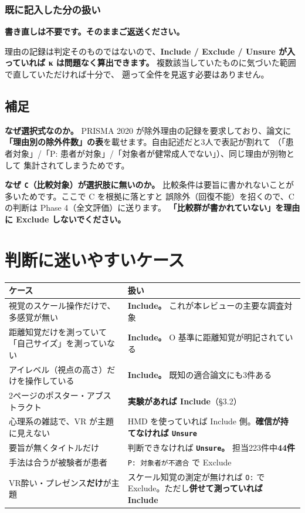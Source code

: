 \documentclass[a4paper]{ltjsarticle}
\newcommand{\keybox}[1]{%
  \par\medskip
  \noindent\colorbox{soft}{%
    \begin{minipage}{\dimexpr\linewidth-2\fboxsep\relax}
      \vspace{2pt}\centering\bfseries\large #1\vspace{4pt}
    \end{minipage}}%
  \par\medskip}
\newcommand{\rsn}[1]{\texttt{\small #1}}
\begin{document}
\subsubsection*{既に記入した分の扱い}

\keybox{書き直しは不要です。そのままご返送ください。}

\noindent
理由の記録は判定そのものではないので、\textbf{Include / Exclude / Unsure が入っていれば
κ は問題なく算出できます。}
複数該当していたものに気づいた範囲で直していただければ十分で、
遡って全件を見返す必要はありません。

\subsection{補足}

\noindent
\textbf{なぜ選択式なのか。} PRISMA 2020 が除外理由の記録を要求しており、論文に
\textbf{「理由別の除外件数」の表}を載せます。自由記述だと3人で表記が割れて
（「患者対象」/「P: 患者が対象」/「対象者が健常成人でない」）、同じ理由が別物として
集計されてしまうためです。

\medskip
\noindent
\textbf{なぜ \texttt{C}（比較対象）が選択肢に無いのか。}
比較条件は要旨に書かれないことが多いためです。ここで C を根拠に落とすと
誤除外（回復不能）を招くので、C の判断は Phase 4（全文評価）に送ります。
\textbf{「比較群が書かれていない」を理由に Exclude しないでください。}

\section{判断に迷いやすいケース}

\begin{center}
\begin{tabularx}{\linewidth}{L{16em} X}
\toprule
ケース & 扱い \\
\midrule
視覚のスケール操作だけで、多感覚が無い & \textbf{Include。} これが本レビューの主要な調査対象 \\
距離知覚だけを測っていて「自己サイズ」を測っていない & \textbf{Include。} O 基準に距離知覚が明記されている \\
アイレベル（視点の高さ）だけを操作している & \textbf{Include。} 既知の適合論文にも3件ある \\
2ページのポスター・アブストラクト & \textbf{実験があれば Include}（§3.2） \\
心理系の雑誌で、VR が主題に見えない & HMD を使っていれば Include 側。\textbf{確信が持てなければ \rsn{Unsure}} \\
要旨が無くタイトルだけ & 判断できなければ \textbf{\rsn{Unsure}。} 担当223件中\textbf{44件} \\
手法は合うが被験者が患者 & \rsn{P: 対象者が不適合} で Exclude \\
VR酔い・プレゼンス\textbf{だけ}が主題 & スケール知覚の測定が無ければ \rsn{O:} で Exclude。ただし\textbf{併せて測っていれば Include} \\
\bottomrule
\end{tabularx}
\end{center}
\end{document}
